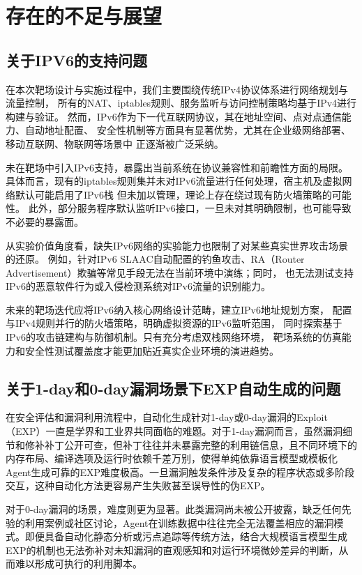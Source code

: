 \documentclass[lang=cn,10pt]{elegantbook}
\begin{document}
\section{存在的不足与展望}

\subsection{关于IPV6的支持问题}

在本次靶场设计与实施过程中，我们主要围绕传统IPv4协议体系进行网络规划与流量控制，
所有的NAT、iptables规则、服务监听与访问控制策略均基于IPv4进行构建与验证。
然而，IPv6作为下一代互联网协议，其在地址空间、点对点通信能力、自动地址配置、
安全性机制等方面具有显著优势，尤其在企业级网络部署、移动互联网、物联网等场景中
正逐渐被广泛采纳。

未在靶场中引入IPv6支持，暴露出当前系统在协议兼容性和前瞻性方面的局限。
具体而言，现有的iptables规则集并未对IPv6流量进行任何处理，宿主机及虚拟网络默认可能启用了IPv6栈
但未加以管理，理论上存在绕过现有防火墙策略的可能性。
此外，部分服务程序默认监听IPv6接口，一旦未对其明确限制，也可能导致不必要的暴露面。

从实验价值角度看，缺失IPv6网络的实验能力也限制了对某些真实世界攻击场景的还原。
例如，针对IPv6 SLAAC自动配置的钓鱼攻击、RA（Router Advertisement）欺骗等常见手段无法在当前环境中演练；同时，
也无法测试支持IPv6的恶意软件行为或入侵检测系统对IPv6流量的识别能力。

未来的靶场迭代应将IPv6纳入核心网络设计范畴，建立IPv6地址规划方案，
配置与IPv4规则并行的防火墙策略，明确虚拟资源的IPv6监听范围，
同时探索基于IPv6的攻击链建构与防御机制。只有充分考虑双栈网络环境，
靶场系统的仿真能力和安全性测试覆盖度才能更加贴近真实企业环境的演进趋势。

\subsection{关于1-day和0-day漏洞场景下EXP自动生成的问题}
在安全评估和漏洞利用流程中，自动化生成针对1-day或0-day漏洞的Exploit（EXP）一直是学界和工业界共同面临的难题。对于1-day漏洞而言，虽然漏洞细节和修补补丁公开可查，但补丁往往并未暴露完整的利用链信息，且不同环境下的内存布局、编译选项及运行时依赖千差万别，使得单纯依靠语言模型或模板化Agent生成可靠的EXP难度极高。一旦漏洞触发条件涉及复杂的程序状态或多阶段交互，这种自动化方法更容易产生失败甚至误导性的伪EXP。

对于0-day漏洞的场景，难度则更为显著。此类漏洞尚未被公开披露，缺乏任何先验的利用案例或社区讨论，Agent在训练数据中往往完全无法覆盖相应的漏洞模式。即便具备自动化静态分析或污点追踪等传统方法，结合大规模语言模型生成EXP的机制也无法弥补对未知漏洞的直观感知和对运行环境微妙差异的判断，从而难以形成可执行的利用脚本。
\end{document}
